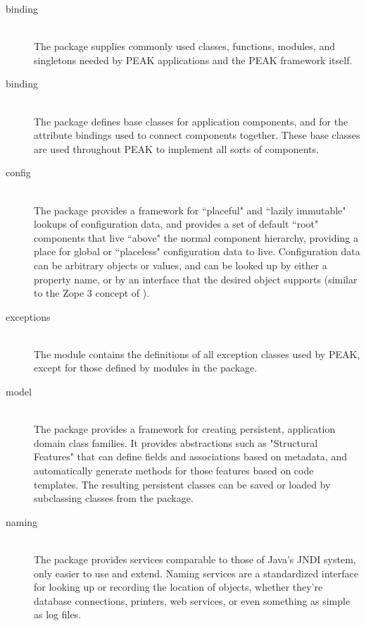 \begin{description}

\item[binding] \hfill \\ 
The  package supplies commonly used classes, functions,
modules, and singletons needed by PEAK applications and the PEAK framework
itself.

\item[binding] \hfill \\ 
The  package defines base classes for application
components, and for the attribute bindings used to connect components
together.  These base classes are used throughout PEAK to implement all
sorts of components.

\item[config] \hfill \\ 
The  package provides a framework for ``placeful" and
``lazily immutable" lookups of configuration data, and provides a set of 
default ``root" components that live ``above" the normal component 
hierarchy, providing a place for global or ``placeless" configuration data
to live.  Configuration data can be arbitrary objects or values, and can
be looked up by either a property name, or by an interface that the desired
object supports (similar to the Zope 3 concept of ).

\item[exceptions] \hfill \\ 
The  module contains the definitions of all exception
classes used by PEAK, except for those defined by modules in the
 package.

\item[model] \hfill \\ 
The  package provides a framework for creating persistent,
application domain class families.  It provides abstractions such as
"Structural Features" that can define fields and associations based on
metadata, and automatically generate methods for those features based on code
templates.  The resulting persistent classes can be saved or loaded by
subclassing  classes from the  package.

\item[naming] \hfill \\ 
The  package provides services comparable to those of
Java's JNDI system, only easier to use and extend.  Naming services are
a standardized interface for looking up or recording the location of objects,
whether they're database connections, printers, web services, or even 
something as simple as log files.


\end{description}
